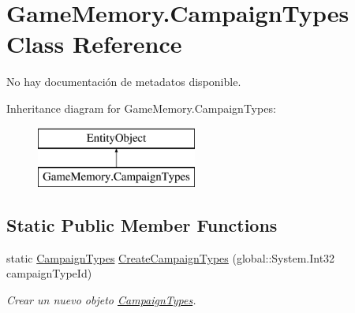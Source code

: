 \hypertarget{class_game_memory_1_1_campaign_types}{\section{Game\-Memory.\-Campaign\-Types Class Reference}
\label{class_game_memory_1_1_campaign_types}
}


No hay documentación de metadatos disponible.  


Inheritance diagram for Game\-Memory.\-Campaign\-Types\-:\begin{figure}[H]
\begin{center}
\leavevmode
\includegraphics[height=2.000000cm]{class_game_memory_1_1_campaign_types}
\end{center}
\end{figure}
\subsection*{Static Public Member Functions}
\begin{DoxyCompactItemize}
\item 
static \hyperlink{class_game_memory_1_1_campaign_types}{Campaign\-Types} \hyperlink{class_game_memory_1_1_campaign_types_a0a6697f45e1d4d17ee4b1b49338662d1}{Create\-Campaign\-Types} (global\-::\-System.\-Int32 campaign\-Type\-Id)
\begin{DoxyCompactList}\small\item\em Crear un nuevo objeto \hyperlink{class_game_memory_1_1_campaign_types}{Campaign\-Types}. \end{DoxyCompactList}\end{DoxyCompactItemize}
